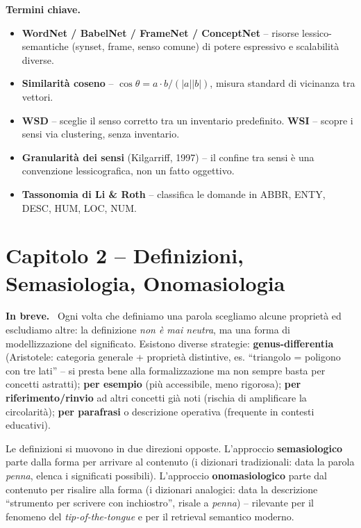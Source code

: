 \documentclass[11pt,a4paper]{article}
\newcommand{\spiega}{\medskip\noindent\textbf{\textcolor{blue!45!black}{In breve.}}\ }
\newcommand{\termini}{\medskip\noindent\textbf{\textcolor{blue!45!black}{Termini chiave.}}}
\begin{document}
\termini
\begin{itemize}
\item \textbf{WordNet / BabelNet / FrameNet / ConceptNet} -- risorse lessico-semantiche (synset, frame, senso comune) di potere espressivo e scalabilit\`a diverse.
\item \textbf{Similarit\`a coseno} -- $\cos\theta = a\cdot b/(|a||b|)$, misura standard di vicinanza tra vettori.
\item \textbf{WSD} -- sceglie il senso corretto tra un inventario predefinito. \textbf{WSI} -- scopre i sensi via clustering, senza inventario.
\item \textbf{Granularit\`a dei sensi} (Kilgarriff, 1997) -- il confine tra sensi \`e una convenzione lessicografica, non un fatto oggettivo.
\item \textbf{Tassonomia di Li \& Roth} -- classifica le domande in ABBR, ENTY, DESC, HUM, LOC, NUM.
\end{itemize}

\section*{Capitolo 2 -- Definizioni, Semasiologia, Onomasiologia}

\spiega
Ogni volta che definiamo una parola scegliamo alcune propriet\`a ed escludiamo altre: la definizione \emph{non \`e mai neutra}, ma una forma di modellizzazione del significato. Esistono diverse strategie: \textbf{genus-differentia} (Aristotele: categoria generale + propriet\`a distintive, es. ``triangolo = poligono con tre lati'' -- si presta bene alla formalizzazione ma non sempre basta per concetti astratti); \textbf{per esempio} (pi\`u accessibile, meno rigorosa); \textbf{per riferimento/rinvio} ad altri concetti gi\`a noti (rischia di amplificare la circolarit\`a); \textbf{per parafrasi} o descrizione operativa (frequente in contesti educativi).

Le definizioni si muovono in due direzioni opposte. L'approccio \textbf{semasiologico} parte dalla forma per arrivare al contenuto (i dizionari tradizionali: data la parola \emph{penna}, elenca i significati possibili). L'approccio \textbf{onomasiologico} parte dal contenuto per risalire alla forma (i dizionari analogici: data la descrizione ``strumento per scrivere con inchiostro'', risale a \emph{penna}) -- rilevante per il fenomeno del \emph{tip-of-the-tongue} e per il retrieval semantico moderno.
\end{document}
